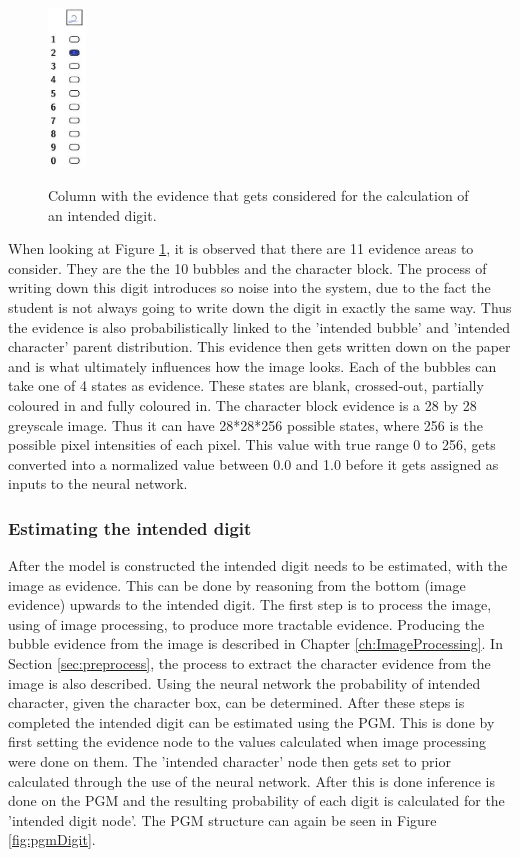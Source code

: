 \begin{figure}
  \centering
  \includegraphics[width=1cm]{column}\\
  \caption{Column with the evidence that gets considered for the calculation of an intended digit.}
  \label{fig:column}
\end{figure}

When looking at Figure \ref{fig:column}, it is observed that there are 11 evidence areas to consider. They are the the 10 bubbles and the character block. The process of writing down this digit introduces so noise into the system, due to the fact the student is not always going to write down the digit in exactly the same way. Thus the evidence is also probabilistically linked to the 'intended bubble' and 'intended character' parent distribution. This evidence then gets written down on the paper and is what ultimately influences how the image looks. Each of the bubbles can take one of 4 states as evidence. These states are blank, crossed-out, partially coloured in and fully coloured in. The character block evidence is a 28 by 28 greyscale image. Thus it can have 28*28*256 possible states, where 256 is the possible pixel intensities of each pixel. This value with true range 0 to 256, gets converted into a normalized value between 0.0 and 1.0 before it gets assigned as inputs to the neural network.


\subsubsection{Estimating the intended digit}
\label{sec:intendedDigit}
After the model is constructed the intended digit needs to be estimated, with the image as evidence. This can be done by reasoning from the bottom (image evidence) upwards to the intended digit. The first step is to process the image, using of image processing, to produce more tractable evidence. Producing the bubble evidence from the image is described in Chapter \ref{ch:ImageProcessing}. In Section \ref{sec:preprocess}, the process to extract the character evidence from the image is also described. Using the neural network the probability of intended character, given the character box, can be determined. After these steps is completed the intended digit can be estimated using the PGM. This is done by first setting the evidence node to the values calculated when image processing were done on them. The 'intended character' node then gets set to prior calculated through the use of the neural network. After this is done inference is done on the PGM and the resulting probability of each digit is calculated for the 'intended digit node'. The PGM structure can again be seen in Figure \ref{fig:pgmDigit}. 


